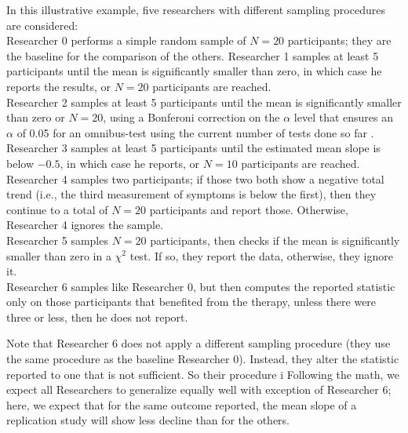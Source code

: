 \documentclass[man]{apa7}
\theoremstyle{definition}
\begin{document}
In this illustrative example, five researchers with different sampling procedures are considered: \\[0.1cm]  %
Researcher 0 performs a simple random sample of $N=20$ participants; they are the baseline for the comparison of the others. 
Researcher 1 samples at least 5 participants until the mean is significantly smaller than zero, in which case he reports the results, or $N=20$ participants are reached. \\
Researcher 2 samples at least 5 participants until the mean is significantly smaller than zero or $N=20$, using a Bonferoni correction on the $\alpha$ level that ensures an $\alpha$ of 0.05 for an omnibus-test using the current number of tests done so far . \\
Researcher 3 samples at least 5 participants until the estimated mean slope is below $-0.5$, in which case he reports, or $N=10$ %
participants are reached.
Researcher 4 samples two participants; if those two both show a negative total trend (i.e., the third measurement of symptoms is below the first), then they continue to a total of $N=20$ participants and report those. Otherwise, Researcher 4 ignores the sample. \\
Researcher 5 samples $N=20$ participants, then checks if the mean is significantly smaller than zero in a $\chi^2$ test. If so, they report the data, otherwise, they ignore it. \\
Researcher 6 samples like Researcher 0, but then computes the reported statistic only on those participants that benefited from the therapy, unless there were three or less, then he does not report. 


Note that Researcher 6 does not apply a different sampling procedure (they use the same procedure as the baseline Researcher 0). %
Instead, they alter the statistic reported to one that is not sufficient. So their procedure i Following the math, we expect all Researchers to generalize equally well with exception of Researcher 6; here, we expect that for the same outcome reported, the mean slope of a replication study will show less decline than for the others. 
\end{document}
